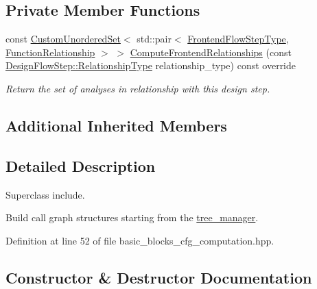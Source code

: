 \subsection*{Private Member Functions}
\begin{DoxyCompactItemize}
\item 
const \hyperlink{classCustomUnorderedSet}{Custom\+Unordered\+Set}$<$ std\+::pair$<$ \hyperlink{frontend__flow__step_8hpp_afeb3716c693d2b2e4ed3e6d04c3b63bb}{Frontend\+Flow\+Step\+Type}, \hyperlink{classFrontendFlowStep_af7cf30f2023e5b99e637dc2058289ab0}{Function\+Relationship} $>$ $>$ \hyperlink{classBasicBlocksCfgComputation_a25a7032f4adc7cb581250474181ae924}{Compute\+Frontend\+Relationships} (const \hyperlink{classDesignFlowStep_a723a3baf19ff2ceb77bc13e099d0b1b7}{Design\+Flow\+Step\+::\+Relationship\+Type} relationship\+\_\+type) const override
\begin{DoxyCompactList}\small\item\em Return the set of analyses in relationship with this design step. \end{DoxyCompactList}\end{DoxyCompactItemize}
\subsection*{Additional Inherited Members}


\subsection{Detailed Description}
Superclass include. 

Build call graph structures starting from the \hyperlink{classtree__manager}{tree\+\_\+manager}. 

Definition at line 52 of file basic\+\_\+blocks\+\_\+cfg\+\_\+computation.\+hpp.



\subsection{Constructor \& Destructor Documentation}
\mbox{\label{classBasicBlocksCfgComputation_abe3d2ac93963619745c87ca963de44bd}} 
